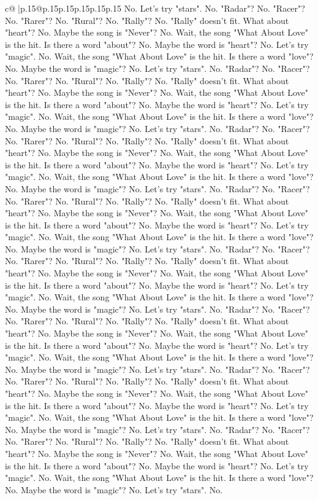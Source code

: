 \documentclass{article}
\begin{document}
{\begin{supertabular}{c@{$\;$}|p{.15\linewidth}@{}p{.15\linewidth}p{.15\linewidth}p{.15\linewidth}p{.15\linewidth}p{.15\linewidth}}
{{{No. Let's try "stars". No. "Radar"? No. "Racer"? No. "Rarer"? No. "Rural"? No. "Rally"? No. "Rally" doesn't fit. What about "heart"? No. Maybe the song is "Never"? No. Wait, the song "What About Love" is the hit. Is there a word "about"? No. Maybe the word is "heart"? No. Let's try "magic". No. Wait, the song "What About Love" is the hit. Is there a word "love"? No. Maybe the word is "magic"? No. Let's try "stars". No. "Radar"? No. "Racer"? No. "Rarer"? No. "Rural"? No. "Rally"? No. "Rally" doesn't fit. What about "heart"? No. Maybe the song is "Never"? No. Wait, the song "What About Love" is the hit. Is there a word "about"? No. Maybe the word is "heart"? No. Let's try "magic". No. Wait, the song "What About Love" is the hit. Is there a word "love"? No. Maybe the word is "magic"? No. Let's try "stars". No. "Radar"? No. "Racer"? No. "Rarer"? No. "Rural"? No. "Rally"? No. "Rally" doesn't fit. What about "heart"? No. Maybe the song is "Never"? No. Wait, the song "What About Love" is the hit. Is there a word "about"? No. Maybe the word is "heart"? No. Let's try "magic". No. Wait, the song "What About Love" is the hit. Is there a word "love"? No. Maybe the word is "magic"? No. Let's try "stars". No. "Radar"? No. "Racer"? No. "Rarer"? No. "Rural"? No. "Rally"? No. "Rally" doesn't fit. What about "heart"? No. Maybe the song is "Never"? No. Wait, the song "What About Love" is the hit. Is there a word "about"? No. Maybe the word is "heart"? No. Let's try "magic". No. Wait, the song "What About Love" is the hit. Is there a word "love"? No. Maybe the word is "magic"? No. Let's try "stars". No. "Radar"? No. "Racer"? No. "Rarer"? No. "Rural"? No. "Rally"? No. "Rally" doesn't fit. What about "heart"? No. Maybe the song is "Never"? No. Wait, the song "What About Love" is the hit. Is there a word "about"? No. Maybe the word is "heart"? No. Let's try "magic". No. Wait, the song "What About Love" is the hit. Is there a word "love"? No. Maybe the word is "magic"? No. Let's try "stars". No. "Radar"? No. "Racer"? No. "Rarer"? No. "Rural"? No. "Rally"? No. "Rally" doesn't fit. What about "heart"? No. Maybe the song is "Never"? No. Wait, the song "What About Love" is the hit. Is there a word "about"? No. Maybe the word is "heart"? No. Let's try "magic". No. Wait, the song "What About Love" is the hit. Is there a word "love"? No. Maybe the word is "magic"? No. Let's try "stars". No. "Radar"? No. "Racer"? No. "Rarer"? No. "Rural"? No. "Rally"? No. "Rally" doesn't fit. What about "heart"? No. Maybe the song is "Never"? No. Wait, the song "What About Love" is the hit. Is there a word "about"? No. Maybe the word is "heart"? No. Let's try "magic". No. Wait, the song "What About Love" is the hit. Is there a word "love"? No. Maybe the word is "magic"? No. Let's try "stars". No. "Radar"? No. "Racer"? No. "Rarer"? No. "Rural"? No. "Rally"? No. "Rally" doesn't fit. What about "heart"? No. Maybe the song is "Never"? No. Wait, the song "What About Love" is the hit. Is there a word "about"? No. Maybe the word is "heart"? No. Let's try "magic". No. Wait, the song "What About Love" is the hit. Is there a word "love"? No. Maybe the word is "magic"? No. Let's try "stars". No. }}}
\end{supertabular}}
\end{document}
